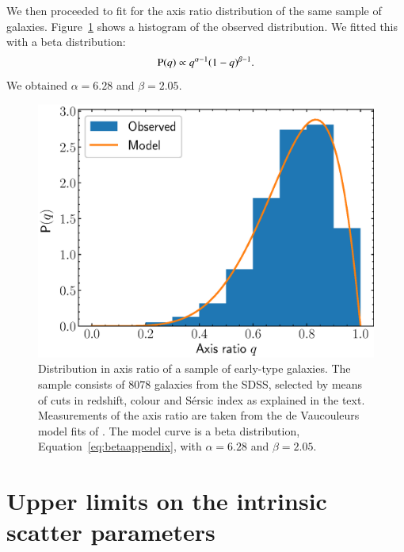 \documentclass{aa}
\def\Fref#1{Figure~\ref{#1}\xspace}
\def\Eref#1{Equation~\ref{#1}\xspace}
\def\pr{{\rm P}}
\begin{document}
We then proceeded to fit for the axis ratio distribution of the same sample of galaxies.
\Fref{fig:qhist} shows a histogram of the observed distribution.
We fitted this with a beta distribution:
\begin{equation}\label{eq:betaappendix}
\pr(q) \propto q^{\alpha-1}(1 - q)^{\beta-1}.
\end{equation}
We obtained $\alpha=6.28$ and $\beta=2.05$.
\begin{figure}
\includegraphics[width=\columnwidth]{q_dist.eps}
\caption{
Distribution in axis ratio of a sample of early-type galaxies.
The sample consists of $8078$ galaxies from the SDSS, selected by means of cuts in redshift, colour and S\'{e}rsic index as explained in the text.
Measurements of the axis ratio are taken from the de Vaucouleurs model fits of \citet{Mee++15}.
The model curve is a beta distribution, \Eref{eq:betaappendix}, with $\alpha=6.28$ and $\beta=2.05$.
\label{fig:qhist}
}
\end{figure}


\section{Upper limits on the intrinsic scatter parameters}\label{sect:appendixb}
\end{document}
